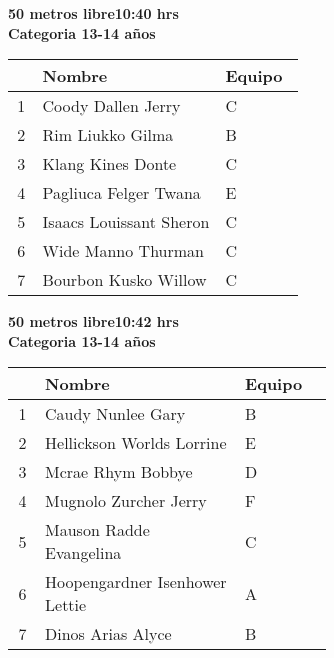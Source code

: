 \begin{minipage}{0.95\linewidth}\vspace{0.5cm} 
\begin{flushleft}
\textbf{
\hspace{-0.15cm}50 metros libre\hspace{1.5cm}10:40 hrs \\Categoria 13-14 años}\vspace{-0.2cm} 
\end{flushleft}
\begin{tabular}{cp{0.63\linewidth}l}
\hline
& \textbf{Nombre} & \textbf{Equipo} \\ \hline
1 & Coody Dallen Jerry & C \\ 
2 & Rim Liukko Gilma & B \\ 
3 & Klang Kines Donte & C \\ 
4 & Pagliuca Felger Twana & E \\ 
5 & Isaacs Louissant Sheron & C \\ 
6 & Wide Manno Thurman & C \\ 
7 & Bourbon Kusko Willow & C \\ 
\end{tabular}
\end{minipage}
\begin{minipage}{0.95\linewidth}\vspace{0.5cm} 
\begin{flushleft}
\textbf{
\hspace{-0.15cm}50 metros libre\hspace{1.5cm}10:42 hrs \\Categoria 13-14 años}\vspace{-0.2cm} 
\end{flushleft}
\begin{tabular}{cp{0.63\linewidth}l}
\hline
& \textbf{Nombre} & \textbf{Equipo} \\ \hline
1 & Caudy Nunlee Gary & B \\ 
2 & Hellickson Worlds Lorrine & E \\ 
3 & Mcrae Rhym Bobbye & D \\ 
4 & Mugnolo Zurcher Jerry & F \\ 
5 & Mauson Radde Evangelina & C \\ 
6 & Hoopengardner Isenhower Lettie & A \\ 
7 & Dinos Arias Alyce & B \\ 
\end{tabular}
\end{minipage}
